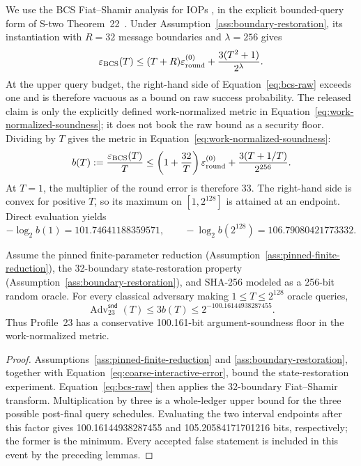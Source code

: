 We use the BCS Fiat--Shamir analysis for IOPs
\cite{BenSassonChiesaSpooner2016}, in the explicit bounded-query form of
S-two Theorem~22~\cite{CarmonEtAl2026Stwo}.  Under
Assumption~\ref{ass:boundary-restoration}, its instantiation with \(R=32\)
message boundaries and \(\lambda=256\) gives
\begin{equation}
 \varepsilon_{\mathrm{BCS}}(T)
 \le (T+R)\varepsilon_{\rm round}^{(0)}
       +\frac{3(T^2+1)}{2^\lambda}.
 \label{eq:bcs-raw}
\end{equation}
At the upper query budget, the right-hand side of
Equation~\eqref{eq:bcs-raw} exceeds one and is therefore vacuous as a bound
on raw success probability.  The released claim is only the explicitly
defined work-normalized metric in
Equation~\eqref{eq:work-normalized-soundness}; it does not book the raw bound
as a security floor.
Dividing by \(T\) gives the metric in
Equation~\eqref{eq:work-normalized-soundness}:
\begin{equation}
 b(T):=\frac{\varepsilon_{\mathrm{BCS}}(T)}{T}
 \le
 \left(1+\frac{32}{T}\right)\varepsilon_{\rm round}^{(0)}
 +\frac{3(T+1/T)}{2^{256}}.
 \label{eq:bcs-normalized}
\end{equation}
At \(T=1\), the multiplier of the round error is therefore 33.  The
right-hand side is convex for positive \(T\), so its maximum on
\([1,2^{128}]\) is attained at an endpoint.  Direct evaluation yields
\[
 -\log_2 b(1)=101.74641188359571,
 \qquad
 -\log_2 b(2^{128})=106.79080421773332.
\]

\begin{theorem}
\label{thm:bcs-soundness}
Assume the pinned finite-parameter reduction
(Assumption~\ref{ass:pinned-finite-reduction}), the 32-boundary
state-restoration property (Assumption~\ref{ass:boundary-restoration}), and
SHA-256 modeled as a 256-bit random oracle.  For every classical adversary making
\(1\le T\le2^{128}\) oracle queries,
\[
 \operatorname{Adv}^{\mathsf{snd}}_{23}(T)
 \le 3b(T)\le 2^{-100.16144938287455}.
\]
Thus Profile~23 has a conservative 100.161-bit argument-soundness floor in
the work-normalized metric.
\end{theorem}

\begin{proof}
Assumptions~\ref{ass:pinned-finite-reduction} and
\ref{ass:boundary-restoration}, together with
Equation~\eqref{eq:coarse-interactive-error}, bound the state-restoration
experiment.  Equation~\eqref{eq:bcs-raw} then applies the 32-boundary
Fiat--Shamir transform.
Multiplication by three is a whole-ledger upper bound for the three possible
post-final query schedules.  Evaluating the two interval endpoints after this
factor gives 100.16144938287455 and 105.20584171701216 bits, respectively;
the former is the minimum.  Every accepted false statement is included in
this event by the preceding lemmas.
\end{proof}
